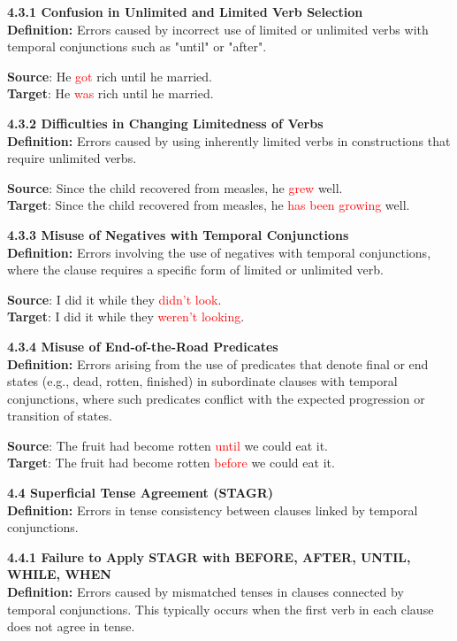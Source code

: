\begin{tcolorbox}[breakable]
\noindent \textbf{4.3.1 Confusion in Unlimited and Limited Verb Selection}\\
\textbf{Definition:} Errors caused by incorrect use of limited or unlimited verbs with temporal conjunctions such as "until" or "after".


\textbf{Source}: He \textcolor{red}{got} rich until he married. \\
\textbf{Target}: He \textcolor{red}{was} rich until he married.


\noindent \textbf{4.3.2 Difficulties in Changing Limitedness of Verbs}\\
\textbf{Definition:} Errors caused by using inherently limited verbs in constructions that require unlimited verbs.


\textbf{Source}: Since the child recovered from measles, he \textcolor{red}{grew} well. \\
\textbf{Target}: Since the child recovered from measles, he \textcolor{red}{has been growing} well.


\noindent \textbf{4.3.3 Misuse of Negatives with Temporal Conjunctions}\\
\textbf{Definition:} Errors involving the use of negatives with temporal conjunctions, where the clause requires a specific form of limited or unlimited verb.


\textbf{Source}: I did it while they \textcolor{red}{didn’t look}. \\
\textbf{Target}: I did it while they \textcolor{red}{weren't looking}.


\noindent \textbf{4.3.4 Misuse of End-of-the-Road Predicates}\\
\textbf{Definition:} Errors arising from the use of predicates that denote final or end states (e.g., dead, rotten, finished) in subordinate clauses with temporal conjunctions, where such predicates conflict with the expected progression or transition of states.


\textbf{Source}: The fruit had become rotten \textcolor{red}{until} we could eat it. \\
\textbf{Target}: The fruit had become rotten \textcolor{red}{before} we could eat it.


\noindent \textbf{4.4 Superficial Tense Agreement (STAGR)}\\
\textbf{Definition:} Errors in tense consistency between clauses linked by temporal conjunctions.

\noindent \textbf{4.4.1 Failure to Apply STAGR with BEFORE, AFTER, UNTIL, WHILE, WHEN}\\
\textbf{Definition:} Errors caused by mismatched tenses in clauses connected by temporal conjunctions. This typically occurs when the first verb in each clause does not agree in tense.



\end{tcolorbox}
